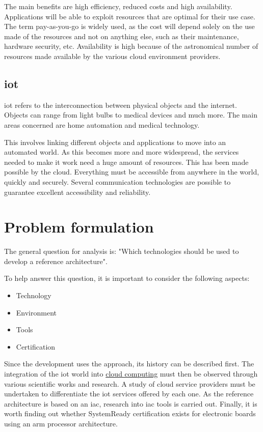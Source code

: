 The main benefits are high efficiency, reduced costs and high availability. Applications will be able to exploit resources that are optimal for their use case. The term pay-as-you-go is widely used, as the cost will depend solely on the use made of the resources and not on anything else, such as their maintenance, hardware security, etc. Availability is high because of the astronomical number of resources made available by the various \gls{cloud} environment providers.

\subsection{\acrlong{iot}}
\label{subsec:iot}
\acrfull{iot} refers to the interconnection between physical objects and the internet. Objects can range from light bulbs to medical devices and much more. The main areas concerned are home automation and medical technology.

This involves linking different objects and applications to move into an automated world. As this becomes more and more widespread, the services needed to make it work need a huge amount of resources. This has been made possible by the \gls{cloud}. Everything must be accessible from anywhere in the world, quickly and securely. Several communication technologies are possible to guarantee excellent accessibility and reliability.

\section{Problem formulation}

The general question for analysis is: "Which technologies should be used to develop a reference architecture".

To help answer this question, it is important to consider the following aspects:
\begin{itemize}
    \item Technology
    \item Environment
    \item Tools
    \item Certification
\end{itemize}
Since the development uses the  approach, its history can be described first. The integration of the \acrshort{iot} world into \hyperref[subsec:cloudcomputing]{cloud computing} must then be observed through various scientific works and research. A study of \gls{cloud} service providers must be undertaken to differentiate the iot services offered by each one. As the reference architecture is based on an \acrfull{iac}, research into \acrshort{iac} tools is carried out. Finally, it is worth finding out whether SystemReady certification exists for electronic boards using an \gls{arm} processor architecture.


